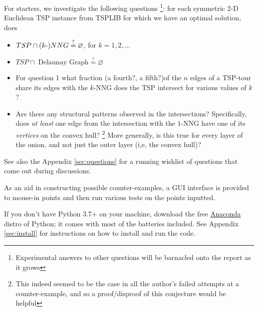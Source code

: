 \begin{description}
     For starters,  we investigate the following questions \footnote{Experimental answers to other questions will be barnacled onto the report as it grows}: 
     for each symmetric 2-D Euclidean TSP instance from TSPLIB for which we have an optimal solution, does

     \begin{itemize}
     \item $TSP \cap (k{\text -})NNG \stackrel{?}{=} \varnothing$, for $k=1,2,\ldots$
     \item $TSP \cap \; \text{Delaunay Graph} \stackrel{?}{=} \varnothing$
     \item For question 1 what fraction (a fourth?, a fifth?)of the $n$ edges of a TSP-tour share its edges with the  $k$-NNG does the TSP intersect for various values of $k$? 
     \item Are there any structural patterns observed in the intersections? Specifically, does \textit{at least } 
           one edge from the intersection with the $1$-NNG have one of its \textit{vertices} on the convex hull? 
           \footnote{This indeed seemed to be the case in all the author's failed attempts at a counter-example, and so a proof/disproof of this conjecture would be helpful}
           More generally, is this true for every layer of the onion, and not just the outer layer (i,e, the convex hull)?
     \end{itemize}

     See also the Appendix \autoref{sec:questions} for a running wishlist of questions that come out during discussions. 

     As an aid in constructing possible counter-examples, a GUI interface is provided to mouse-in points and then 
     run various tests on the points inputted. 
     
     If you don't have  Python 3.7+ on your machine, download the free  \href{https://www.anaconda.com/products/individual}{Anaconda} distro of Python; 
     it comes with most of the batteries included. See Appendix \autoref{sec:install} for instructions on how to install and run the code. 

\end{description}
